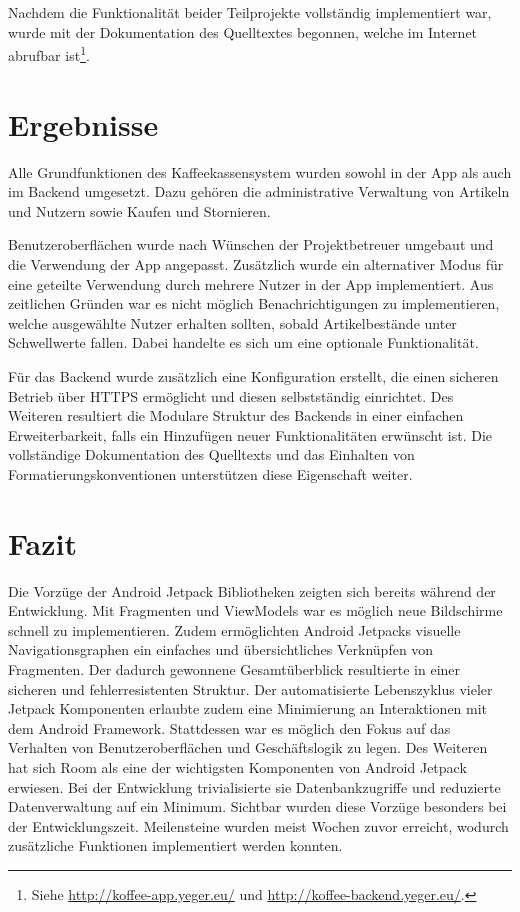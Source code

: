 \documentclass[a4paper, 11pt]{article}
\begin{document}
Nachdem die Funktionalität beider Teilprojekte vollständig implementiert war, wurde mit der Dokumentation des Quelltextes begonnen, welche im Internet abrufbar ist\footnote{Siehe \url{http://koffee-app.yeger.eu/} und \url{http://koffee-backend.yeger.eu/}.}.

\section{Ergebnisse}
\label{sec:results}
Alle Grundfunktionen des Kaffeekassensystem wurden sowohl in der App als auch im Backend umgesetzt.
Dazu gehören die administrative Verwaltung von Artikeln und Nutzern sowie Kaufen und Stornieren.

Benutzeroberflächen wurde nach Wünschen der Projektbetreuer umgebaut und die Verwendung der App angepasst.
Zusätzlich wurde ein alternativer Modus für eine geteilte Verwendung durch mehrere Nutzer in der App implementiert.
Aus zeitlichen Gründen war es nicht möglich Benachrichtigungen zu implementieren, welche ausgewählte Nutzer erhalten sollten, sobald Artikelbestände unter Schwellwerte fallen.
Dabei handelte es sich um eine optionale Funktionalität.

Für das Backend wurde zusätzlich eine Konfiguration erstellt, die einen sicheren Betrieb über HTTPS ermöglicht und diesen selbstständig einrichtet.
Des Weiteren resultiert die Modulare Struktur des Backends in einer einfachen Erweiterbarkeit, falls ein Hinzufügen neuer Funktionalitäten erwünscht ist.
Die vollständige Dokumentation des Quelltexts und das Einhalten von Formatierungskonventionen unterstützen diese Eigenschaft weiter.

\section{Fazit}
\label{sec:conclusion}
Die Vorzüge der Android Jetpack Bibliotheken zeigten sich bereits während der Entwicklung.
Mit Fragmenten und ViewModels war es möglich neue Bildschirme schnell zu implementieren.
Zudem ermöglichten Android Jetpacks visuelle Navigationsgraphen ein einfaches und übersichtliches Verknüpfen von Fragmenten.
Der dadurch gewonnene Gesamtüberblick resultierte in einer sicheren und fehlerresistenten Struktur.
Der automatisierte Lebenszyklus vieler Jetpack Komponenten erlaubte zudem eine Minimierung an Interaktionen mit dem Android Framework.
Stattdessen war es möglich den Fokus auf das Verhalten von Benutzeroberflächen und Geschäftslogik zu legen.
Des Weiteren hat sich Room als eine der wichtigsten Komponenten von Android Jetpack erwiesen.
Bei der Entwicklung trivialisierte sie Datenbankzugriffe und reduzierte Datenverwaltung auf ein Minimum.
Sichtbar wurden diese Vorzüge besonders bei der Entwicklungszeit.
Meilensteine wurden meist Wochen zuvor erreicht, wodurch zusätzliche Funktionen implementiert werden konnten.
\end{document}
